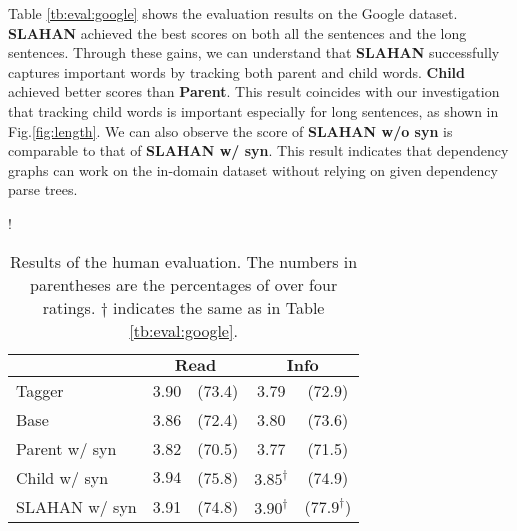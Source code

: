 \documentclass[letterpaper]{article} \usepackage{aaai20}  \usepackage{times}  \usepackage{helvet} \usepackage{courier}  \usepackage[hyphens]{url}  \usepackage{graphicx} \urlstyle{rm} \def\UrlFont{\rm}  \usepackage{graphicx}  \frenchspacing  \setlength{\pdfpagewidth}{8.5in}  \setlength{\pdfpageheight}{11in}  \usepackage{tabu}
\begin{document}
Table \ref{tb:eval:google} shows the evaluation results on the Google dataset. 
\textbf{SLAHAN} achieved the best scores on both all the sentences and the long sentences. Through these gains, we can understand that \textbf{SLAHAN} successfully captures important words by tracking both parent and child words.
\textbf{Child} achieved better scores than \textbf{Parent}. This result coincides with our investigation that tracking child words is important especially for long sentences, as shown in Fig.\ref{fig:length}. 
We can also observe the score of \textbf{SLAHAN w/o syn} is comparable to that of \textbf{SLAHAN w/ syn}.
This result indicates that dependency graphs can work on the in-domain dataset without relying on given dependency parse trees.
\begin{table}[!t]
\centering
\small
\resizebox {0.6\columnwidth} {!} {
\begin{tabular}{lcccc}
\toprule
& \multicolumn{2}{c}{$\mathbf{Read}$} & \multicolumn{2}{c}{$\mathbf{Info}$} \\
\midrule
Tagger       & 3.90 & \hspace{-3mm}(73.4) & \hspace{-1mm}3.79 & \hspace{-3mm}(72.9) \\
Base        & 3.86 & \hspace{-3mm}(72.4) & \hspace{-1mm}3.80 & \hspace{-3mm}(73.6) \\
Parent w/ syn & 3.82 & \hspace{-3mm}(70.5) & \hspace{-1mm}3.77 & \hspace{-3mm}(71.5) \\
\midrule
Child w/ syn & $\mathbf{3.94}$ & \hspace{-3mm}($\mathbf{75.8}$) & \hspace{-1mm}$3.85^{\dagger}$ & \hspace{-3mm}(74.9) \\
SLAHAN w/ syn & 3.91 & \hspace{-3mm}(74.8) & \hspace{-1mm}$\mathbf{3.90}^{\dagger}$ & \hspace{-3mm}($\mathbf{77.9}^{\dagger}$) \\
\bottomrule
\end{tabular}
}
    \caption{Results of the human evaluation.
    The numbers in parentheses are the percentages of over four ratings. $\dagger$ indicates the same as in Table \ref{tb:eval:google}. \label{tb:eval:human}}
\end{table}
\end{document}
